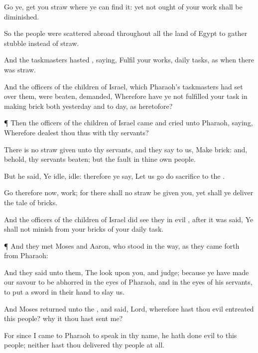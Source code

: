 {Go ye,
get you
straw
where ye can
find it:
yet not
ought of your
work shall be
diminished.

So the
people were scattered
abroad throughout all the
land of
Egypt to
gather
stubble instead of
straw.

And the
taskmasters
hasted
{},
saying,
Fulfil your
works,
{}
daily
tasks, as when there
was
straw.

And the
officers of the
children of
Israel, which
Pharaoh’s
taskmasters had
set over them, were
beaten,
{}
demanded, Wherefore have ye not
fulfilled your
task in making
brick both
yesterday and to
day, as
heretofore?


\par }{\PP {}¶ Then the
officers of the
children of
Israel
came and
cried unto
Pharaoh,
saying, Wherefore
dealest thou thus with thy
servants?

There is no
straw
given unto thy
servants, and they
say to us,
Make
brick: and, behold, thy
servants
{}
beaten; but the
fault
{} in thine own
people.

But he
said, Ye
{}
idle,
{}
idle: therefore ye
say, Let us
go
{} do
sacrifice to the
{}.

Go therefore now,
{}
work; for there shall no
straw be
given you, yet shall ye
deliver the
tale of
bricks.

And the
officers of the
children of
Israel did
see
{} they
{} in
evil
{}, after it was
said, Ye shall not
minish
{} from your
bricks of your
daily
task.


\par }{\PP {}¶ And they
met
Moses and
Aaron, who
stood in the
way, as they came
forth from
Pharaoh:

And they
said unto them, The
{}
look upon you, and
judge; because ye have made our
savour to be
abhorred in the
eyes of
Pharaoh, and in the
eyes of his
servants, to
put a
sword in their
hand to
slay us.

And
Moses
returned unto the
{}, and
said,
Lord, wherefore hast thou
{} evil
entreated this
people? why
{} it
{} thou hast
sent me?

For since I
came to
Pharaoh to
speak in thy
name, he hath done
evil to this
people; neither hast thou
delivered thy
people at
all.




}
